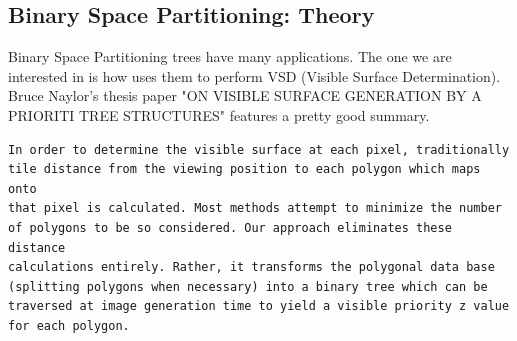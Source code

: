 \pagebreak

\subsection{Binary Space Partitioning: Theory}
Binary Space Partitioning trees have many applications. The one we are interested in is how \doom uses them to perform VSD (Visible Surface Determination). Bruce Naylor's thesis paper "ON VISIBLE SURFACE GENERATION BY A PRIORITI TREE STRUCTURES" features a pretty good summary.\\

 \begin{verbatim}
In order to determine the visible surface at each pixel, traditionally
tile distance from the viewing position to each polygon which maps onto 
that pixel is calculated. Most methods attempt to minimize the number 
of polygons to be so considered. Our approach eliminates these distance
calculations entirely. Rather, it transforms the polygonal data base 
(splitting polygons when necessary) into a binary tree which can be 
traversed at image generation time to yield a visible priority z value
for each polygon.
\end{verbatim}

